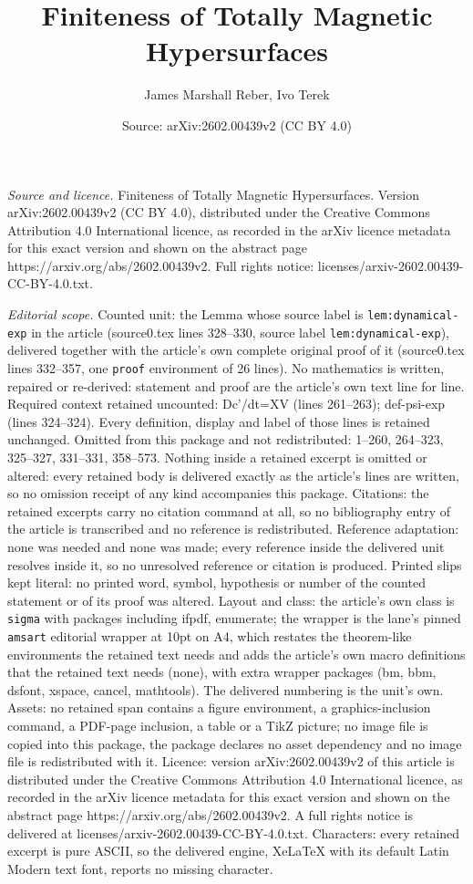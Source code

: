 \documentclass[10pt,a4paper]{amsart}
\title[Finiteness of Totally Magnetic Hypersurfaces]{Finiteness of Totally Magnetic Hypersurfaces}
\author{James Marshall Reber, Ivo Terek}
\date{Source: arXiv:2602.00439v2 (CC BY 4.0)}
\begin{document}
\maketitle

\noindent\emph{Source and licence.} Finiteness of Totally Magnetic Hypersurfaces. Version arXiv:2602.00439v2 (CC BY 4.0), distributed under the Creative Commons Attribution 4.0 International licence, as recorded in the arXiv licence metadata for this exact version and shown on the abstract page https://arxiv.org/abs/2602.00439v2. Full rights notice: licenses/arxiv-2602.00439-CC-BY-4.0.txt.\par\smallskip

\noindent\textit{Editorial scope.} Counted unit: the Lemma whose source label is \texttt{lem:dynamical-exp} in the article (source0.tex lines 328--330, source label \texttt{lem:dynamical-exp}), delivered together with the article's own complete original proof of it (source0.tex lines 332--357, one \texttt{proof} environment of 26 lines). No mathematics is written, repaired or re-derived: statement and proof are the article's own text line for line. Required context retained uncounted: Dc'/dt=XV (lines 261--263); def-psi-exp (lines 324--324). Every definition, display and label of those lines is retained unchanged. Omitted from this package and not redistributed: 1--260, 264--323, 325--327, 331--331, 358--573. Nothing inside a retained excerpt is omitted or altered: every retained body is delivered exactly as the article's lines are written, so no omission receipt of any kind accompanies this package. Citations: the retained excerpts carry no citation command at all, so no bibliography entry of the article is transcribed and no reference is redistributed. Reference adaptation: none was needed and none was made; every reference inside the delivered unit resolves inside it, so no unresolved reference or citation is produced. Printed slips kept literal: no printed word, symbol, hypothesis or number of the counted statement or of its proof was altered. Layout and class: the article's own class is \texttt{sigma} with packages including ifpdf, enumerate; the wrapper is the lane's pinned \texttt{amsart} editorial wrapper at 10pt on A4, which restates the theorem-like environments the retained text needs and adds the article's own macro definitions that the retained text needs (none), with extra wrapper packages (bm, bbm, dsfont, xspace, cancel, mathtools). The delivered numbering is the unit's own. Assets: no retained span contains a figure environment, a graphics-inclusion command, a PDF-page inclusion, a table or a TikZ picture; no image file is copied into this package, the package declares no asset dependency and no image file is redistributed with it. Licence: version arXiv:2602.00439v2 of this article is distributed under the Creative Commons Attribution 4.0 International licence, as recorded in the arXiv licence metadata for this exact version and shown on the abstract page https://arxiv.org/abs/2602.00439v2. A full rights notice is delivered at licenses/arxiv-2602.00439-CC-BY-4.0.txt. Characters: every retained excerpt is pure ASCII, so the delivered engine, XeLaTeX with its default Latin Modern text font, reports no missing character.
\end{document}
